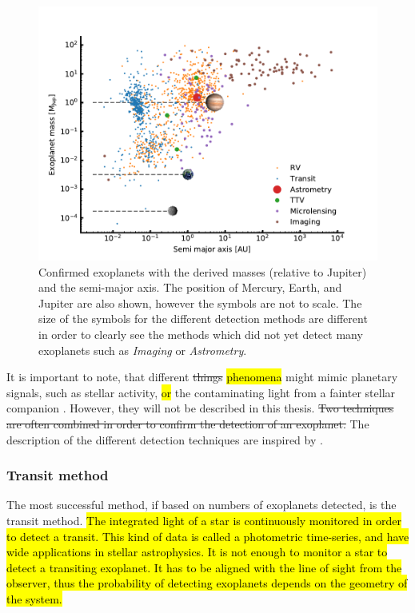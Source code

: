 \begin{figure}[htpb!]
    \centering
    \includegraphics[width=1.0\linewidth]{figures/exoplanetDetectionType.pdf}
    \caption{Confirmed exoplanets with the derived masses (relative to Jupiter) and the semi-major
             axis. The position of Mercury, Earth, and Jupiter are also shown, however the symbols
             are not to scale. The size of the symbols for the different detection methods are
             different in order to clearly see the methods which did not yet detect many exoplanets
             such as \emph{Imaging} or \emph{Astrometry}.}
    \label{fig:detectionTypes}
\end{figure}

It is important to note, that different \st{things} \hl{phenomena} might mimic planetary signals,
such as stellar activity, \hl{or} the contaminating light from a fainter stellar companion
\citep[see e.g.][]{Oshagh2013,Oshagh2014}. However, they will not be described in this thesis.
\st{Two techniques are often combined in order to confirm the detection of an exoplanet.} The
description of the different detection techniques are inspired by \citet{Seager2010}.


\subsubsection{Transit method}
\label{sec:transitMethod}

The most successful method, if based on numbers of exoplanets detected, is the transit method.
\hl{The integrated light of a star is continuously monitored in order to detect a transit. This kind
of data is called a photometric time-series, and have wide applications in stellar astrophysics. It
is not enough to monitor a star to detect a transiting exoplanet. It has to be aligned with the line
of sight from the observer, thus the probability of detecting exoplanets depends on the geometry of
the system.}

